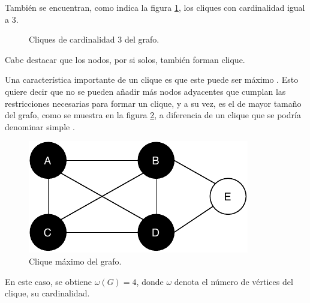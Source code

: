 También se encuentran, como indica la figura \ref{fig:graph-cliques-3}, los cliques con cardinalidad igual a 3.
\begin{figure}[H]
	\centering	
	\caption{Cliques de cardinalidad 3 del grafo.}
	\label{fig:graph-cliques-3}
\end{figure}
Cabe destacar que los nodos, por si solos, también forman clique.

Una característica importante de un clique es que este puede ser máximo \cite{web-maximumclique}. Esto quiere decir que no se pueden añadir más nodos adyacentes que cumplan las restricciones necesarias para formar un clique, y a su vez, es el de mayor tamaño del grafo, como se muestra en la figura \ref{fig:max-clique}, a diferencia de un clique que se podría denominar simple  \cite{web-maximalclique}. 
\begin{figure}[H]
	\centering
	\includegraphics{Figures/graph-clique-max.pdf}
	\caption{Clique máximo del grafo.}
	\label{fig:max-clique}
\end{figure}
En este  caso, se obtiene $\omega(G) = 4$, donde $\omega$ denota el número de vértices del clique, su cardinalidad.

